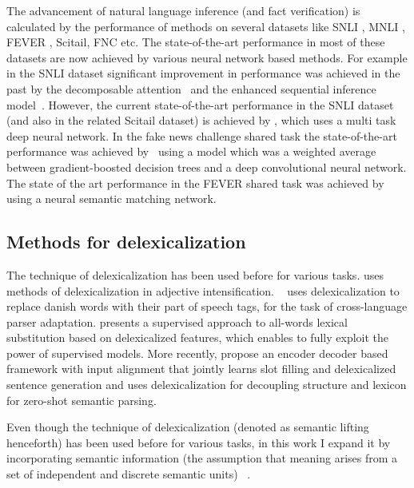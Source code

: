 \documentclass{article}
\begin{document}
The advancement of natural language inference (and fact verification) is calculated by the performance of methods on several datasets like SNLI \citep*{bowman2015large}, MNLI \citep*{williams2017broad}, FEVER \citep*{thorne2018fever}, Scitail\citep*{khot2018scitail}, FNC \citep*{pomerleau2017fake} etc. The state-of-the-art  performance in most of these datasets are now achieved by various neural network based methods. For example in the SNLI \citep*{bowman2015large} dataset significant improvement in performance was achieved in the past by the decomposable attention~\citep*{parikh2016decomposable} and the enhanced sequential inference model~\citep*{chen2016enhanced}. However, the current state-of-the-art performance in the SNLI dataset (and also in the related Scitail\citep*{khot2018scitail} dataset) is achieved by  \citep*{liu2019multi} , which uses a multi task deep neural network. In the fake news challenge shared task \citep*{pomerleau2017fake} the state-of-the-art performance was achieved by~\citep*{baird2017talos} using a model which was a weighted average between gradient-boosted decision trees and a deep convolutional neural network. The state of the art performance in the FEVER \citep*{thorne2018fever} shared task was achieved by \cite{nie2019combining} using a neural semantic matching network.

\subsection{Methods for delexicalization}
The technique of delexicalization has been used before for various tasks. \citep*{lorenz2002really} uses methods of delexicalization in adjective intensification. ~\citep*{zeman2008cross} uses delexicalization to replace danish words with their part of speech tags, for the task of cross-language parser adaptation. \citep*{szarvas2013supervised} presents a supervised approach to
all-words lexical substitution based on delexicalized features, which enables to fully exploit the power of supervised models. More recently,  \citep*{shin2018slot} propose an encoder decoder based framework with input alignment that jointly learns slot filling and delexicalized sentence generation and \citep*{herzig2018decoupling} uses delexicalization for decoupling structure and lexicon for zero-shot semantic parsing.

Even though the technique of delexicalization (denoted as semantic lifting henceforth) has been used before for various tasks, in this work I expand it by incorporating semantic information (the assumption that meaning arises from a set of independent and discrete semantic units)~\citep*{peyrard2019simple} . 
\end{document}
